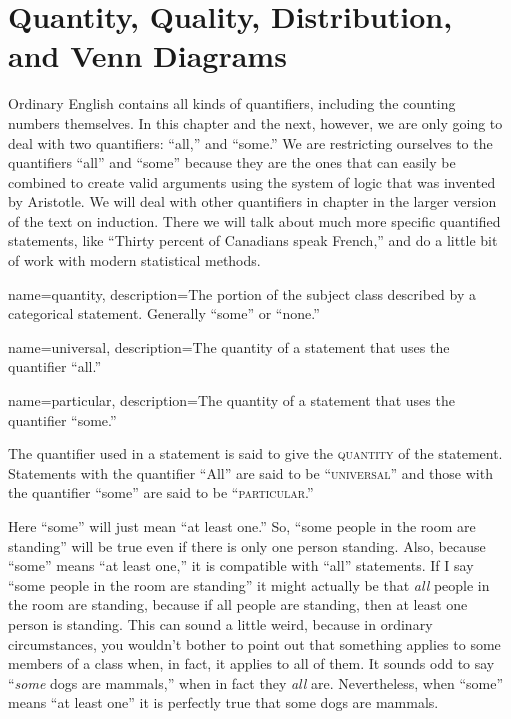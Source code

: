 
\section{Quantity, Quality, Distribution, and Venn Diagrams}
\label{sec:QQDVD}
Ordinary English contains all kinds of quantifiers, including the counting numbers themselves. In this chapter and the next, however, we are only going to deal with two quantifiers: ``all,'' and ``some.'' We are restricting ourselves to the quantifiers ``all'' and ``some'' because they are the ones that can easily be combined to create valid arguments using the system of logic that was invented by Aristotle. We will deal with other quantifiers in chapter in the larger version of the text on induction. \label{ver_var}  There we will talk about much more specific quantified statements, like ``Thirty percent of Canadians speak French,'' and do a little bit of work with modern statistical methods. 

{
name=quantity,
description={The portion of the subject class described by a categorical statement. Generally ``some'' or ``none.''}
}

{
name=universal,
description={The quantity of a statement that uses the quantifier ``all.''}
}

{
name=particular,
description={The quantity of a statement that uses the quantifier ``some.''}
}

The quantifier used in a statement is said to give the \textsc{\gls{quantity}} \label{def:Quantity} of the statement. Statements with the quantifier ``All'' are said to be ``\textsc{\gls{universal}}'' and those with the quantifier ``some'' are said to be ``\textsc{\gls{particular}}.''

Here ``some'' will just mean ``at least one.'' So, ``some people in the room are standing'' will be true even if there is only one person standing. Also, because ``some'' means ``at least one,'' it is compatible with ``all'' statements. If I say ``some people in the room are standing'' it might actually be that \textit{all} people in the room are standing, because if all people are standing, then at least one person is standing. This can sound a little weird, because in ordinary circumstances, you wouldn't bother to point out that something applies to some members of a class when, in fact, it applies to all of them. It sounds odd to say ``\textit{some} dogs are mammals,'' when in fact they \textit{all} are. Nevertheless, when ``some'' means ``at least one'' it is perfectly true that some dogs are mammals. 



